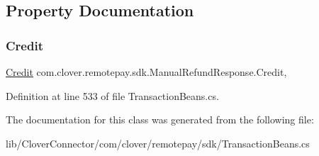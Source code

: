 \subsection{Property Documentation}
\mbox{\label{classcom_1_1clover_1_1remotepay_1_1sdk_1_1_manual_refund_response_a2ec27e6342c1beb413b171e22a2d8be0}} 
\subsubsection{\texorpdfstring{Credit}{Credit}}
{\footnotesize\ttfamily \hyperlink{classcom_1_1clover_1_1sdk_1_1v3_1_1payments_1_1_credit}{Credit} com.\+clover.\+remotepay.\+sdk.\+Manual\+Refund\+Response.\+Credit\hspace{0.3cm}{\ttfamily [get]}, {\ttfamily [set]}}



Definition at line 533 of file Transaction\+Beans.\+cs.



The documentation for this class was generated from the following file\+:\begin{DoxyCompactItemize}
\item 
lib/\+Clover\+Connector/com/clover/remotepay/sdk/Transaction\+Beans.\+cs\end{DoxyCompactItemize}
